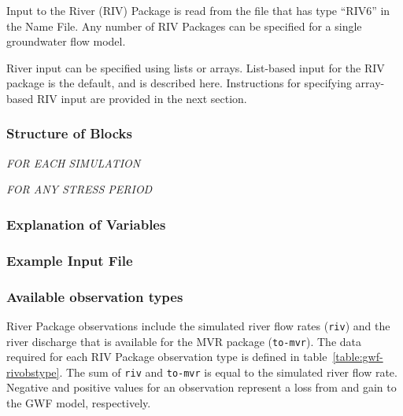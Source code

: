 Input to the River (RIV) Package is read from the file that has type ``RIV6'' in the Name File.  Any number of RIV Packages can be specified for a single groundwater flow model.

River input can be specified using lists or arrays.  List-based input for the RIV package is the default, and is described here.  Instructions for specifying array-based RIV input are provided in the next section.

\vspace{5mm}
\subsubsection{Structure of Blocks}
\vspace{5mm}

\noindent \textit{FOR EACH SIMULATION}


\vspace{5mm}
\noindent \textit{FOR ANY STRESS PERIOD}

\packageperioddescription

\vspace{5mm}
\subsubsection{Explanation of Variables}
\begin{description}

\end{description}

\vspace{5mm}
\subsubsection{Example Input File}


\vspace{5mm}
\subsubsection{Available observation types}
River Package observations include the simulated river flow rates (\texttt{riv}) and the river discharge that is available for the MVR package (\texttt{to-mvr}). The data required for each RIV Package observation type is defined in table~\ref{table:gwf-rivobstype}. The sum of \texttt{riv} and \texttt{to-mvr} is equal to the simulated river flow rate. Negative and positive values for an observation represent a loss from and gain to the GWF model, respectively.

